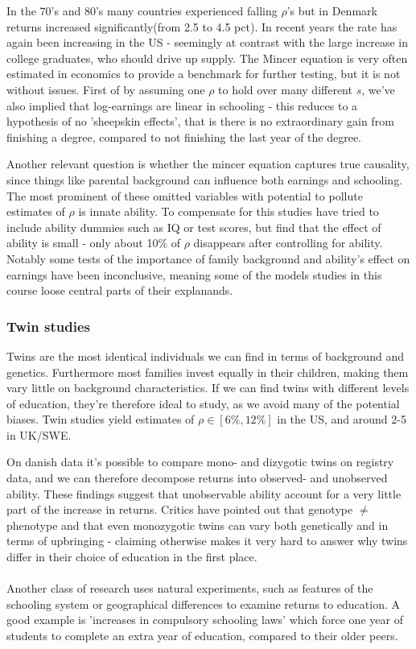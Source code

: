 \documentclass[12pt, a4paper]{article}
\begin{document}
\begin{multicols}{2}
In the 70's and 80's many countries experienced falling $\rho$'s but in Denmark returns increased significantly(from 2.5 to 4.5 pct). In recent years the rate has again been increasing in the US - seemingly at contrast with the large increase in college graduates, who should drive up supply. The Mincer equation is very often estimated in economics to provide a benchmark for further testing, but it is not without issues. First of by assuming one $\rho$ to hold over many different $s$, we've also implied that log-earnings are linear in schooling - this reduces to a hypothesis of no 'sheepskin effects', that is there is no extraordinary gain from finishing a degree, compared to not finishing the last year of the degree.

Another relevant question is whether the mincer equation captures true causality, since things like parental background can influence both earnings and schooling. The most prominent of these omitted variables with potential to pollute estimates of $\rho$ is innate ability. To compensate for this studies have tried to include ability dummies such as IQ or test scores, but find that the effect of ability is small - only about 10\% of $\rho$ disappears after controlling for ability. Notably some tests of the importance of family background and ability's effect on earnings have been inconclusive, meaning some of the models studies in this course loose central parts of their explanands.

\subsubsection{Twin studies}
Twins are the most identical individuals we can find in terms of background and genetics. Furthermore most families invest equally in their children, making them vary little on background characteristics. If we can find twins with different levels of education, they're therefore ideal to study, as we avoid many of the potential biases. Twin studies yield estimates of $\rho \in [6\%,12\%]$ in the US, and around 2-5 in UK/SWE.

On danish data it's possible to compare mono- and dizygotic twins on registry data, and we can therefore decompose returns into observed- and unobserved ability. These findings suggest that unobservable ability account for a very little part of the increase in returns. Critics have pointed out that genotype $\neq$ phenotype and that even monozygotic twins can vary both genetically and in terms of upbringing - claiming otherwise makes it very hard to answer why twins differ in their choice of education in the first place.
\\ \\
Another class of research uses natural experiments, such as features of the schooling system or geographical differences to examine returns to education. A good example is 'increases in compulsory schooling laws' which force one year of students to complete an extra year of education, compared to their older peers.


\end{multicols}
\end{document}
